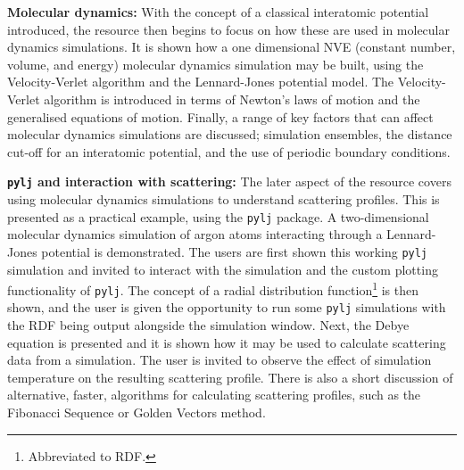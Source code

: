 \textbf{Molecular dynamics:} With the concept of a classical interatomic potential introduced, the resource then begins to focus on how these are used in molecular dynamics simulations.
It is shown how a one dimensional NVE (constant number, volume, and energy) molecular dynamics simulation may be built, using the Velocity-Verlet algorithm and the Lennard-Jones potential model.\autocite{swope_computer_1982,lennard-jones_determination_1924}
The Velocity-Verlet algorithm is introduced in terms of Newton's laws of motion and the generalised equations of motion.
Finally, a range of key factors that can affect molecular dynamics simulations are discussed; simulation ensembles, the distance cut-off for an interatomic potential, and the use of periodic boundary conditions.

\textbf{\texttt{pylj} and interaction with scattering:} The later aspect of the resource covers using molecular dynamics simulations to understand scattering profiles.
This is presented as a practical example, using the \texttt{pylj} package.\autocite{mccluskey_pylj_2018,mccluskey_arm61/pylj_2019-2}
A two-dimensional molecular dynamics simulation of argon atoms interacting through a Lennard-Jones potential is demonstrated.
The users are first shown this working \texttt{pylj} simulation and invited to interact with the simulation and the custom plotting functionality of \texttt{pylj}.
The concept of a radial distribution function\footnote{Abbreviated to RDF.} is then shown, and the user is given the opportunity to run some \texttt{pylj} simulations with the RDF being output alongside the simulation window.
Next, the Debye equation\autocite{debye_zerstreuung_1915} is presented and it is shown how it may be used to calculate scattering data from a simulation.
The user is invited to observe the effect of simulation temperature on the resulting scattering profile.
There is also a short discussion of alternative, faster, algorithms for calculating scattering profiles, such as the Fibonacci Sequence or Golden Vectors method.\autocite{watson_rapid_2013,svergun_solution_1994}

